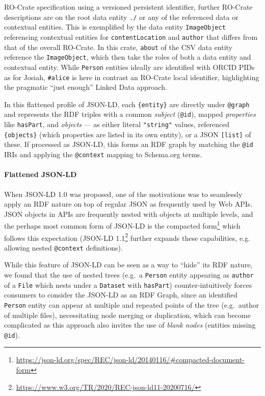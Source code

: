 \begin{listing}
{  RO-Crate specification using a versioned persistent identifier, further
  RO-Crate descriptions are on the root data entity \texttt{./} or any of the
  referenced data or contextual entities. This is exemplified by the data
  entity \texttt{ImageObject} referencing contextual entities for
  \texttt{contentLocation} and \texttt{author} that differs from that of the overall
  RO-Crate. In this crate, \texttt{about} of the CSV data entity reference the
  \texttt{ImageObject}, which then take the roles of both a data entity and
  contextual entity. While \texttt{Person} entities ideally are identified with
  ORCID PIDs as for Josiah, \texttt{\#alice} is here in contrast an RO-Crate
  local identifier, highlighting the pragmatic ``just enough'' Linked
  Data approach.}\label{ch5:lis1}
\end{listing}
  

In this flattened profile of JSON-LD, each \texttt{\{entity\}} are
directly under \texttt{@graph} and represents the RDF triples with a
common \emph{subject} (\texttt{@id}), mapped \emph{properties} like
\texttt{hasPart}, and \emph{objects} --- as either literal
\texttt{"string"} values, referenced \texttt{\{objects\}} (which
properties are listed in its own entity), or a JSON \texttt{{[}list{]}}
of these. If processed as JSON-LD, this forms an RDF graph by matching
the \texttt{@id} IRIs and applying the \texttt{@context} mapping to
Schema.org terms. \normalsize

\paragraph{Flattened JSON-LD}\label{ch5:flattened-json-ld}

When JSON-LD 1.0 \cite{ch5-112}
was
proposed, one of the motivations was to seamlessly apply an RDF nature
on top of regular JSON as frequently used by Web APIs. JSON objects in
APIs are frequently nested with objects at multiple levels, and the
perhaps most common form of JSON-LD is the compacted
form\footnote{\url{https://json-ld.org/spec/REC/json-ld/20140116/\#compacted-document-form}}
which follows this expectation (JSON-LD
1.1\footnote{\url{https://www.w3.org/TR/2020/REC-json-ld11-20200716/}} further
expands these capabilities, e.g. allowing nested \texttt{@context} definitions).


While this feature of JSON-LD can be seen as a way to ``hide'' its RDF
nature, we found that the use of nested trees (e.g.~a \texttt{Person}
entity appearing as \texttt{author} of a \texttt{File} which nests under
a \texttt{Dataset} with \texttt{hasPart}) counter-intuitively forces
consumers to consider the JSON-LD as an RDF Graph, since an identified
\texttt{Person} entity can appear at multiple and repeated points of the
tree (e.g.~author of multiple files), necessitating node merging or
duplication, which can become complicated as this approach also invites
the use of \emph{blank nodes} (entities missing \texttt{@id}).

